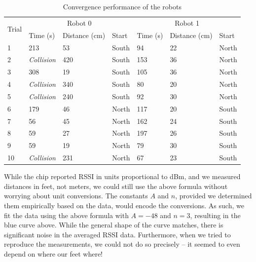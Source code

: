 \documentclass[]{article}
\newcommand{\ra}[1]{\renewcommand{\arraystretch}{#1}}
\begin{document}
\begin{table}[]
\centering
\ra{1.3}
\caption{Convergence performance of the robots}
\label{table:convergence}
\begin{tabular}{@{}lllllll@{}}
\toprule
\multirow{2}{*}{Trial} & \multicolumn{3}{c}{Robot 0}       & \multicolumn{3}{c}{Robot 1}      \\ \cmidrule(l){2-4} \cmidrule(l){5-7}
                       & Time (s)  & Distance (cm) & Start & Time (s) & Distance (cm) & Start \\ \midrule
1                      & 213       & 53            & South & 94       & 22            & North \\
2                      & \emph{Collision} & 420           & South & 153      & 36            & North \\
3                      & 308       & 19            & South & 105      & 36            & North \\
4                      & \emph{Collision} & 340           & South & 80       & 20            & North \\
5                      & \emph{Collision} & 240           & South & 92       & 30            & North \\
6                      & 179       & 46            & North & 117      & 20            & South \\
7                      & 56        & 45            & North & 162      & 24            & South \\
8                      & 59        & 27            & North & 197      & 26            & South \\
9                      & 59        & 19            & North & 79       & 30            & South \\
10                     & \emph{Collision} & 231           & North & 67       & 23            & South \\ \bottomrule
\end{tabular}
\end{table}

While the chip reported RSSI in units proportional to dBm, and we
measured distances in feet, not meters, we could still use the above
formula without worrying about unit conversions. The constants $A$ and
$n$, provided we determined them empirically based on the data, would
encode the conversions. As such, we fit the data using the above formula
with $A=-48$ and $n=3$, resulting in the blue curve above. While the
general shape of the curve matches, there is significant noise in the
averaged RSSI data. Furthermore, when we tried to reproduce the
measurements, we could not do so precisely -- it seemed to even depend
on where our feet where!
\end{document}
